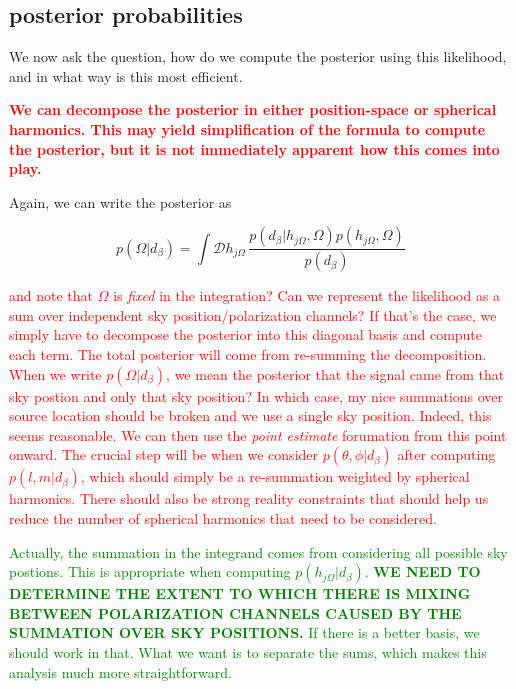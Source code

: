 \documentclass[10pt]{article}
\begin{document}
\subsection{posterior probabilities}

We now ask the question, how do we compute the posterior using this likelihood, and in what way is this most efficient.

\textcolor{red}{\textbf{We can decompose the posterior in either position-space or spherical harmonics. This may yield simplification of the formula to compute the posterior, but it is not immediately apparent how this comes into play.}}

Again, we can write the posterior as 

\begin{equation}
p(\Omega|d_\beta) = \int\mathcal{D}h_{j\Omega}\, \frac{p(d_\beta|h_{j\Omega}, \Omega)p(h_{j\Omega}, \Omega)}{p(d_\beta)}
\end{equation}

\textcolor{red}{and note that $\Omega$ is \emph{fixed} in the integration? Can we represent the likelihood as a sum over independent sky position/polarization channels? If that's the case, we simply have to decompose the posterior into this diagonal basis and compute each term. The total posterior will come from re-summing the decomposition. When we write $p(\Omega|d_\beta)$, we mean the posterior that the signal came from that sky postion and only that sky position? In which case, my nice summations over source location should be broken and we use a single sky position. Indeed, this seems reasonable. We can then use the \emph{point estimate} forumation from this point onward. The crucial step will be when we consider $p(\theta,\phi|d_\beta)$ after computing $p(l,m|d_\beta)$, which should simply be a re-summation weighted by spherical harmonics. There should also be strong reality constraints that should help us reduce the number of spherical harmonics that need to be considered.}

\textcolor{green}{Actually, the summation in the integrand comes from considering all possible sky postions. This is appropriate when computing $p(h_{j\Omega}|d_\beta)$. \textbf{WE NEED TO DETERMINE THE EXTENT TO WHICH THERE IS MIXING BETWEEN POLARIZATION CHANNELS CAUSED BY THE SUMMATION OVER SKY POSITIONS.} If there is a better basis, we should work in that. What we want is to separate the sums, which makes this analysis much more straightforward.}



\end{document}
